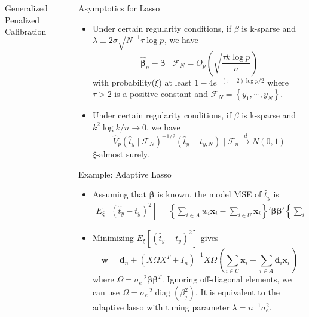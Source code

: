 \documentclass[final]{beamer}
\newlength{\sepwidth}
\newlength{\colwidth}
\newcommand{\separatorcolumn}{\begin{column}{\sepwidth}\end{column}}
\renewcommand{\bf}[1]{\boldsymbol{\mathbf{#1}}}
\renewcommand{\cal}[1]{\mathcal{#1}}
\newcommand{\set}[1]{\left\{#1\right\}} %
\newcommand{\pa}[1]{\left(#1\right)} %
\newcommand{\bra}[1]{\left[#1\right]} %
\DeclareMathOperator{\diag}{diag}
\begin{document}
\begin{frame}[t]
\begin{columns}[t]
\begin{column}{\colwidth}
\begin{alertblock}{Generalized Penalized Calibration}
  \end{alertblock}

\end{column}

\separatorcolumn

\begin{column}{\colwidth}

  \begin{block}{Asymptotics for Lasso}

\begin{itemize}
    \item Under certain regularity conditions, if $\beta$ is k-sparse and $\lambda \equiv 2\sigma\sqrt{N^{-1} \tau \log p}$, we have
\begin{equation}
    \hat {\bf \beta}_n - \bf \beta \mid \cal F_N = O_p\pa{\sqrt{\frac{\tau k\log p}{n}}}
\end{equation}
with probability($\xi$) at least $1 - 4e^{-(\tau - 2) \log p / 2}$ where $\tau > 2$ is a positive constant and $\cal F_N = \set{y_1, \cdots, y_N}$.
    \item Under certain regularity conditions, if $\beta$ is k-sparse and $k^2\log k / n \to 0$, we have
\begin{equation}
    \hat V_p(\hat t_y \mid \cal F_N)^{-1/2} (\hat t_y - t_{y, N}) \mid \cal F_n \stackrel{d}{\to}N(0, 1)
\end{equation}
$\xi$-almost surely.
\end{itemize}

  \end{block}

  \begin{block}{Example: Adaptive Lasso}

\begin{itemize}
    \item Assuming that $\bf \beta$ is known, the model MSE of $\hat t_y$ is
    \begin{eqnarray*} 
     E_\xi \bra{\pa{\hat t_y - t_y}^2} = \left\{ \sum_{i \in A} w_i \bf x_i - \sum_{i \in U} \bf x_i \right\}' \bf \beta \bf \beta' \left\{ \sum_{i \in A} w_i \bf x_i - \sum_{i \in U} \bf x_i \right\} + \sigma_e^2 \sum_{i \in A}(w_i - d_i)^2 + \mbox{Const.} 
    \end{eqnarray*} 
    \item Minimizing $E_\xi \bra{\pa{\hat t_y - t_y}^2}$ gives
        \begin{equation}
            \bf w = \bf d_n + (X\Omega X^T + I_n)^{-1}X\Omega\pa{\sum_{i \in U}\bf x_i - \sum_{i \in A} \bf d_i \bf x_i} \label{what3}
        \end{equation}
        where $\Omega = \sigma_e^{-2} \bf \beta \bf \beta^T$. Ignoring off-diagonal elements, we can use $\Omega = \sigma_e^{-2}\diag\pa{\beta_j^2}$. It is equivalent to the adaptive lasso with tuning parameter $\lambda = n^{-1}\sigma_e^2$.
\end{itemize}


\end{block}
\end{column}
\end{columns}
\end{frame}
\end{document}
